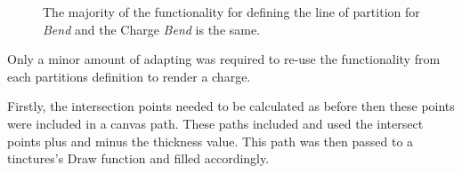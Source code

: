 \begin{figure}[H]
\hfill
{}
\hfill
\caption{The majority of the functionality for defining the line of partition for \emph{Bend} and the Charge \emph{Bend} is the same.}
\label{fig:charge}
\end{figure}


Only a minor amount of adapting was required to re-use the functionality from each partitions definition to render a charge.

Firstly, the intersection points needed to be calculated as before then these points were included in a canvas path.  These paths included and used the intersect points plus and minus the thickness value.  This path was then passed to a tinctures's Draw function and filled accordingly. 


